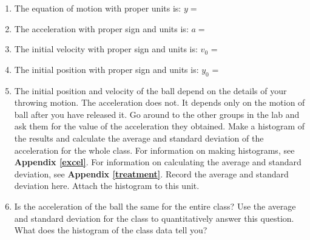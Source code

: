 \begin{enumerate}
\item The equation of motion with proper units is: $y =$\vspace{5mm}

\item The acceleration with proper sign and units is: $a =$ \vspace{5mm}

\item The initial velocity with proper sign and units is: \(v_{0} \) = \vspace{5mm}

\item The initial position with proper sign and units is: \(y_{0} \) = \vspace{5mm}

\item The initial position and velocity of the ball depend on the details of your throwing motion. 
The acceleration does not.
It depends only on the motion of ball after you have released it.
Go around to the other groups in the lab and ask them for the value of the acceleration they obtained.
Make a histogram of the results and calculate the average and standard deviation of the acceleration for the whole class.
For information on making histograms, see \textbf{Appendix \ref{excel}}. For information on calculating the average and
standard deviation, see \textbf{Appendix \ref{treatment}}. Record the average and standard deviation here.
Attach the histogram to this unit.
\vspace{15mm}

\item Is the acceleration of the ball the same for the entire class? Use the average and standard deviation for the class to quantitatively answer this question. What does the histogram of the class data tell you?
\vspace{15mm}

\end{enumerate}
